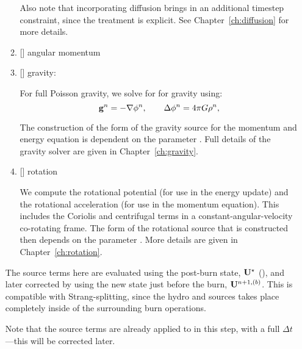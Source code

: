 \begin{enumerate}
\begin{enumerate}
    Also note that incorporating diffusion brings in an additional
    timestep constraint, since the treatment is explicit.  See
    Chapter~\ref{ch:diffusion} for more details. 

  \item {[]} angular momentum 


  \item {[]} gravity:

    For full Poisson gravity, we solve for for gravity using:
    \begin{equation}
      {\bf g}^n = -\nabla\phi^n, \qquad
      \Delta\phi^n = 4\pi G\rho^n,
    \end{equation}

    The construction of the form of the gravity source for the
    momentum and energy equation is dependent on the parameter
    .  Full details of the gravity
    solver are given in Chapter~\ref{ch:gravity}.



  \item {[]} rotation

    We compute the rotational potential (for use in the energy update)
    and the rotational acceleration (for use in the momentum
    equation).  This includes the Coriolis and centrifugal terms in a
    constant-angular-velocity co-rotating frame.  The form of the
    rotational source that is constructed then depends on the
    parameter .  More details are
    given in Chapter~\ref{ch:rotation}.
    
  \end{enumerate}

  The source terms here are evaluated using the post-burn state,
  ${\bf U}^\star$ (), and later corrected by using the
  new state just before the burn, ${\bf U}^{n+1,(b)}$.  This is compatible
  with Strang-splitting, since the hydro and sources takes place
  completely inside of the surrounding burn operations.

  Note that the source terms are already applied to 
  in this step, with a full $\Delta t$---this will be corrected later.


\end{enumerate}
